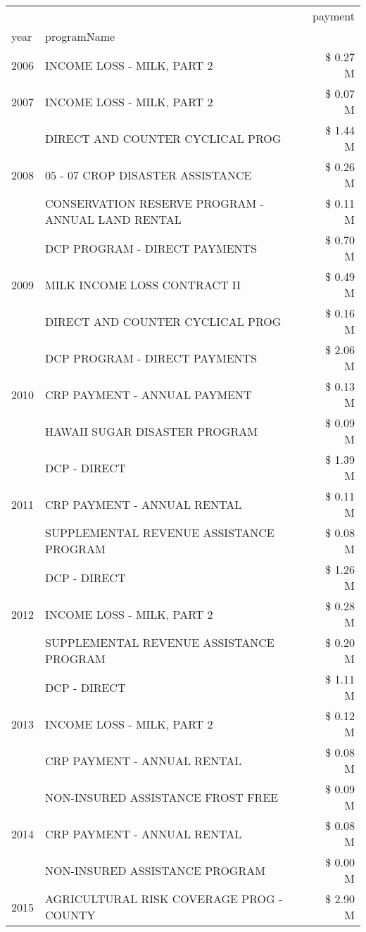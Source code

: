 \begin{tabular}{llr}
\toprule
 &  & payment \\
year & programName &  \\
\midrule
2006 & INCOME LOSS - MILK, PART 2 & \$ 0.27 M \\
\cline{1-3}
2007 & INCOME LOSS - MILK, PART 2 & \$ 0.07 M \\
\cline{1-3}
\multirow[t]{3}{*}{2008} & DIRECT AND COUNTER CYCLICAL PROG & \$ 1.44 M \\
 & 05 - 07 CROP DISASTER ASSISTANCE & \$ 0.26 M \\
 & CONSERVATION RESERVE PROGRAM - ANNUAL LAND RENTAL & \$ 0.11 M \\
\cline{1-3}
\multirow[t]{3}{*}{2009} & DCP PROGRAM - DIRECT PAYMENTS & \$ 0.70 M \\
 & MILK INCOME LOSS CONTRACT II & \$ 0.49 M \\
 & DIRECT AND COUNTER CYCLICAL PROG & \$ 0.16 M \\
\cline{1-3}
\multirow[t]{3}{*}{2010} & DCP PROGRAM - DIRECT PAYMENTS & \$ 2.06 M \\
 & CRP PAYMENT - ANNUAL PAYMENT & \$ 0.13 M \\
 & HAWAII SUGAR DISASTER PROGRAM & \$ 0.09 M \\
\cline{1-3}
\multirow[t]{3}{*}{2011} & DCP - DIRECT & \$ 1.39 M \\
 & CRP PAYMENT - ANNUAL RENTAL & \$ 0.11 M \\
 & SUPPLEMENTAL REVENUE ASSISTANCE PROGRAM & \$ 0.08 M \\
\cline{1-3}
\multirow[t]{3}{*}{2012} & DCP - DIRECT & \$ 1.26 M \\
 & INCOME LOSS - MILK, PART 2 & \$ 0.28 M \\
 & SUPPLEMENTAL REVENUE ASSISTANCE PROGRAM & \$ 0.20 M \\
\cline{1-3}
\multirow[t]{3}{*}{2013} & DCP - DIRECT & \$ 1.11 M \\
 & INCOME LOSS - MILK, PART 2 & \$ 0.12 M \\
 & CRP PAYMENT - ANNUAL RENTAL & \$ 0.08 M \\
\cline{1-3}
\multirow[t]{3}{*}{2014} & NON-INSURED ASSISTANCE FROST FREE & \$ 0.09 M \\
 & CRP PAYMENT - ANNUAL RENTAL & \$ 0.08 M \\
 & NON-INSURED ASSISTANCE PROGRAM & \$ 0.00 M \\
\cline{1-3}
\multirow[t]{3}{*}{2015} & AGRICULTURAL RISK COVERAGE PROG - COUNTY & \$ 2.90 M \\

\end{tabular}
